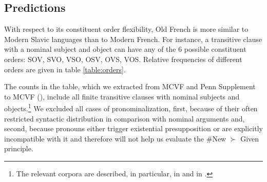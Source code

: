 \documentclass[output=paper,modfonts,nonflat]{langsci/langscibook}
\begin{document}
\subsection{Predictions}

With respect to its constituent order flexibility, Old French is more similar to Modern Slavic languages than to Modern French. For instance, a transitive clause with a nominal subject and object can have any of the 6 possible constituent orders: SOV, SVO, VSO, OSV, OVS, VOS. Relative frequencies of different orders are given in table \ref{table:orders}. 




The counts in the table, which we extracted from MCVF \cite{MCVF} and Penn Supplement to MCVF (\citealt{KrochSantorini:2010}), include all finite transitive clauses with nominal subjects and objects.\footnote{The relevant corpora are described, in particular, in \citet{Martineau:2008} and in \citet{SimonenkoCrabbePrevost:2018}.} We excluded all cases of pronominalization, first, because of their often restricted syntactic distribution in comparison with nominal arguments and, second, because pronouns either trigger existential presupposition or are explicitly incompatible with it and therefore will not help us evaluate the \#New $\succ$ Given principle.
\end{document}
